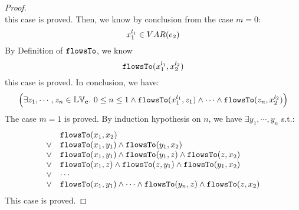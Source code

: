 \begin{proof}
\[\]
this case is proved.
%
Then, we know by conclusion from the case $m = 0$:
\[
  x_1^{l_1} \in VAR(e_2)
\]
%
By Definition of $\mathtt{flowsTo}$, we know
\[
  \mathtt{flowsTo}(x_1^{l_1}, x_2^{l_2}) 
\]
this case is proved.
%
In conclusion, we have:
\[
  \Big( \exists z_1, \cdots, z_n \in \mathbb{LV}_{{\boldsymbol{\mathbf{c}}}}. ~ 0 \leq n \leq 1 \land
  \mathtt{flowsTo}(x_1^{l_1}, z_1) 
  \land \cdots \land \mathtt{flowsTo}(z_n, x_2^{l_2}) \Big)
\]
The case $m = 1$ is proved.
%
By induction hypothesis on $n$, we have $\exists y_1, \cdots, y_n$ s.t.:
\[
\begin{array}{ll}
      & \mathtt{flowsTo}(x_1, x_2) \\
  \lor  & \mathtt{flowsTo}(x_1, y_1) \land \mathtt{flowsTo}(y_1, x_2)\\
  \lor  & \mathtt{flowsTo}(x_1, y_1) \land \mathtt{flowsTo}(y_1, z) \land \mathtt{flowsTo}(z, x_2) \\
  \lor  & \mathtt{flowsTo}(x_1, z) \land \mathtt{flowsTo}(z, y_1) \land \mathtt{flowsTo}(y_1, x_2) \\
  \lor  & \cdots \\
  \lor  & \mathtt{flowsTo}(x_1, y_1) \land \cdots \land \mathtt{flowsTo}(y_n, z) \land \mathtt{flowsTo}(z, x_2) \\
\end{array}
\]
This case is proved.


\end{proof}
